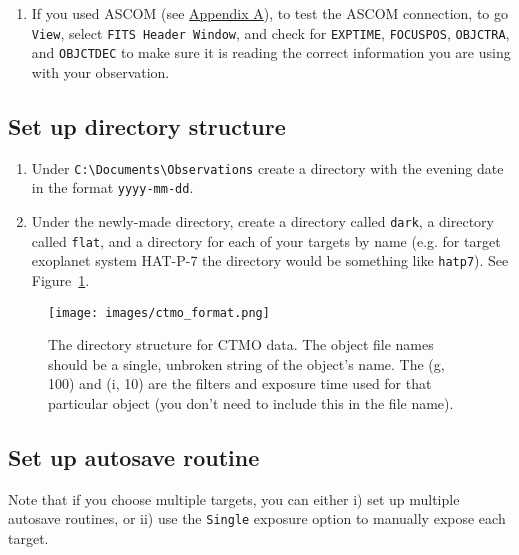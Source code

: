 \documentclass{article}
\begin{document}
\begin{enumerate}
		\item If you used ASCOM (see \hyperref[sec:set-up-ascom]{Appendix A}), to test the ASCOM connection, to go \texttt{View}, select \texttt{FITS Header Window}, and check for \texttt{EXPTIME}, \texttt{FOCUSPOS}, \texttt{OBJCTRA}, and \texttt{OBJCTDEC} to make sure it is reading the correct information you are using with your observation. 
		
	\end{enumerate}
	
	\subsection{Set up directory structure}
	\label{sec:set-up-directory-structure}
	
	\begin{enumerate}
		
		\item Under \texttt{C:\textbackslash Documents\textbackslash Observations} create a directory with the evening date in the format \texttt{yyyy-mm-dd}.
		
		\item Under the newly-made directory, create a directory called \texttt{dark}, a directory called \texttt{flat}, and a directory for each of your targets by name (e.g. for target exoplanet system HAT-P-7 the directory would be something like \texttt{hatp7}). See Figure~\ref{fig:directory}.
		
	\end{enumerate}
	
	\begin{figure}[htbp!]
		\centering
		\texttt{[image: images/ctmo\_format.png]}
		\caption{The directory structure for CTMO data. The object file names should be a single, unbroken string of the object's name. The (g, 100) and (i, 10) are the filters and exposure time used for that particular object (you don't need to include this in the file name).}
		\label{fig:directory}
	\end{figure}
	
	\subsection{Set up autosave routine}
	\label{sec:set-up-autosave-routine}
	
	Note that if you choose multiple targets, you can either i) set up multiple autosave routines, or ii) use the \texttt{Single} exposure option to manually expose each target.
	
\end{document}
